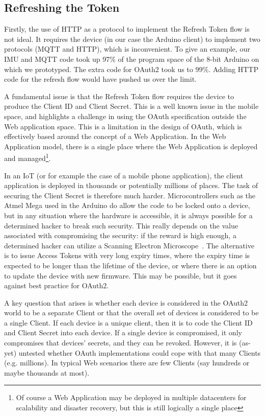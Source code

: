 \documentclass{IEEEtran}
\begin{document}
\subsection{Refreshing the Token}
Firstly, the use of HTTP as a protocol to implement the Refresh Token flow is not ideal. 
It requires the device (in our case the Arduino client) to implement two protocols (MQTT and HTTP), which is 
inconvenient. To give an example, our IMU and MQTT code took up 97\% of the program space of the 8-bit 
Arduino on which we prototyped. The extra code for OAuth2 took us to 99\%.
Adding HTTP code for the refresh flow would have pushed us over the limit.

A fundamental issue is that the Refresh Token flow requires the device to 
produce the Client ID and Client Secret. This is a well known issue in the mobile space, and 
highlights a challenge in using the OAuth specification outside the Web application space.
This is a limitation in the design of OAuth, which is effectively based around the concept 
of a Web Application. In the Web Application model, there is a single place where the Web Application
is deployed and managed\footnote{Of course a Web Application may be deployed in multiple datacenters
for scalability and disaster recovery, but this is still logically a single place}.

In an IoT (or for example the case of a mobile phone application), the client application is deployed in 
thousands or potentially millions of places. The task of securing the Client Secret is therefore 
much harder. Microcontrollers such as the Atmel Mega used in the Arduino do
allow the code to be locked onto a device, but in any situation where the hardware is 
accessible, it is always possible for a determined hacker to break such security. This really 
depends on the value associated with compromising the security: if the reward is high enough, 
a determined hacker can utilize a Scanning Electron Microscope~\cite{silicon-investigations}.
The alternative is to issue Access Tokens with very long expiry times, where the expiry time 
is expected to be longer than the lifetime of the device, or where there is an option to update
the device with new firmware. This may be possible, but it goes against best practice for OAuth2.

A key question that arises is whether each device is considered in the OAuth2 world to be a separate Client or 
that the overall set of devices is considered to be a single Client. If each device is a unique client, then it is  to 
code the Client ID and Client Secret into each device. If a single device is compromised, it only 
compromises that devices' secrets, and they can be revoked. However, it is (as-yet) untested whether OAuth implementations
could cope with that many Clients (e.g. millions). In typical Web scenarios there are few Clients (say hundreds or maybe thousands at most).
\end{document}
